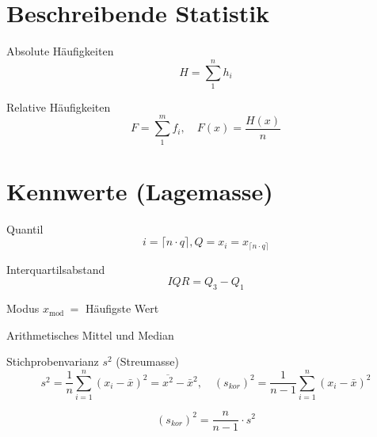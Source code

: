 \section{Beschreibende Statistik}
\begin{definition}{Absolute Häufigkeiten}
$$
H=\sum_{1}^{n} h_{i}
$$
\end{definition}

\begin{definition}{Relative Häufigkeiten}
$$
F=\sum_{1}^{m} f_{i}, \quad F(x)=\frac{H(x)}{n}
$$
\end{definition}

\section{Kennwerte (Lagemasse)}
\begin{definition}{Quantil}
$$
i=\lceil n \cdot q\rceil, Q=x_{i}=x_{\lceil n \cdot q\rceil}
$$
\end{definition}

\begin{definition}{Interquartilsabstand}
$$
I Q R=Q_{3}-Q_{1}
$$
\end{definition}

\begin{definition}{Modus}
$x_{\text {mod }}=$ Häufigste Wert
\end{definition}

\begin{concept}{Arithmetisches Mittel und Median}
	\begin{center}
\end{center}
\end{concept}

\begin{definition}{Stichprobenvarianz $s^{2}$ (Streumasse)}
$$
s^{2}=\frac{1}{n} \sum_{i=1}^{n}\left(x_{i}-\bar{x}\right)^{2}=\overline{x^{2}}-\bar{x}^{2}, \quad\left(s_{k o r}\right)^{2}=\frac{1}{n-1} \sum_{i=1}^{n}\left(x_{i}-\bar{x}\right)^{2}
$$

$$
\left(s_{k o r}\right)^{2}=\frac{n}{n-1} \cdot s^{2}
$$
\end{definition}

